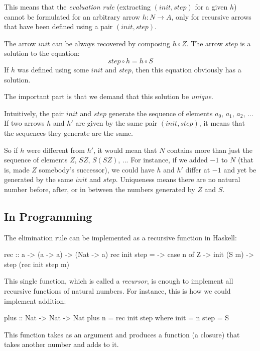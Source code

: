 \documentclass[DaoFP]{subfiles}
\begin{document}
This means that the \emph{evaluation rule} (extracting $(init, step)$ for a given $h$) cannot be formulated for an arbitrary arrow $h \colon N \to A$, only for recursive arrows that have been defined using a pair $(init, step)$. 

The arrow $init$ can be always recovered by composing $h \circ Z$. The arrow $step$ is a solution to the equation:
\[ step \circ h = h \circ S \]
If $h$ was defined using some $init$ and $step$, then this equation obviously has a solution. 

The important part is that we demand that this solution be \emph{unique}. 

Intuitively, the pair $init$ and $step$ generate the sequence of elements $a_0$, $a_1$, $a_2$, ... If two arrows $h$ and $h'$ are given by the same pair $(init, step)$, it means that the sequences they generate are the same. 

So if $h$ were different from $h'$, it would mean that $N$ contains more than just the sequence of elements $Z$, $S Z$, $S(S Z)$, ... For instance, if we added $-1$ to $N$ (that is, made $Z$ somebody's successor), we could have $h$ and $h'$ differ at $-1$ and yet be generated by the same $init$ and $step$. Uniqueness means there are no natural number before, after, or in between the numbers generated by $Z$ and $S$.

\subsection{In Programming}

The elimination rule can be implemented as a recursive function in Haskell:

\begin{haskell}
rec :: a -> (a -> a) -> (Nat -> a)
rec init step = \n ->
  case n of
    Z     -> init
    (S m) -> step (rec init step m)
\end{haskell}

This single function, which is called a \emph{recursor}, is enough to implement all recursive functions of natural numbers. For instance, this is how we could implement addition:

\begin{haskell}
plus :: Nat -> Nat -> Nat
plus n = rec init step
  where
    init = n
    step = S
\end{haskell}
This function takes  as an argument and produces a function (a closure) that takes another number and adds   to it. 
\end{document}
